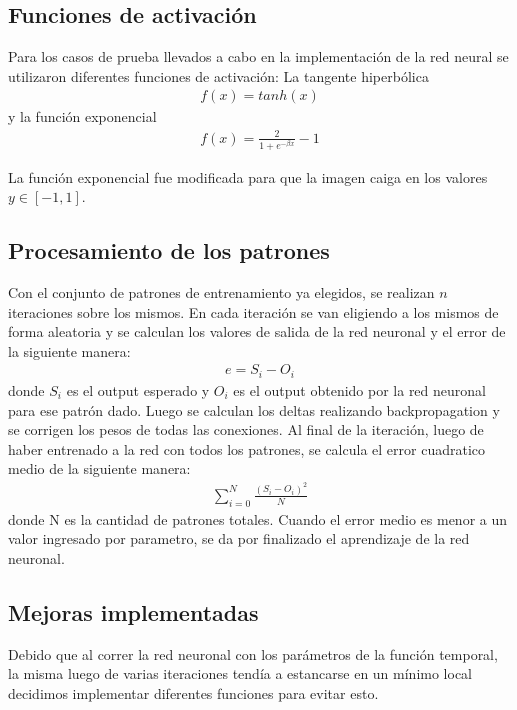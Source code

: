 \documentclass[11pt]{article}
\begin{document}
    \subsection{Funciones de activación}
    \par Para los casos de prueba llevados a cabo en la implementación de la red neural se utilizaron diferentes funciones de activación: La tangente hiperbólica \begin{eqnarray} \label{eq:solve} f(x) = tanh(x) \end{eqnarray} y la función exponencial \begin{eqnarray} \label{eq:solve} f(x) = \frac{2}{1+ e^{-\beta x}}-1 \end{eqnarray} 
    \par La función exponencial fue modificada para que la imagen caiga en los valores $y \in [-1 ,1]$.
    \subsection{Procesamiento de los patrones}
    \par Con el conjunto de patrones de entrenamiento ya elegidos, se realizan $n$ iteraciones sobre los mismos. En cada iteración se van eligiendo a los mismos de forma aleatoria y se calculan los valores de salida de la red neuronal y el error de la siguiente manera:
    \begin{eqnarray} \label{eq:solve} e = S_{i} - O_{i} \end{eqnarray} donde $S_{i}$ es el output esperado y $O_{i}$ es el output obtenido por la red neuronal para ese patrón dado. Luego se calculan los deltas realizando backpropagation y se corrigen los pesos de todas las conexiones. Al final de la iteración, luego de haber entrenado a la red con todos los patrones, se calcula el error cuadratico medio de la siguiente manera:
    \begin{eqnarray} \label{eq:solve} \sum\limits_{i=0}^N \frac{{(S_{i} - O_{i})}^2}{N} \end{eqnarray} donde N es la cantidad de patrones totales. Cuando el error medio es menor a un valor ingresado por parametro, se da por finalizado el aprendizaje de la red neuronal.
    
    \subsection{Mejoras implementadas}
    \par Debido que al correr la red neuronal con los parámetros de la función temporal, la misma luego de varias iteraciones tendía a estancarse en un mínimo local decidimos implementar diferentes funciones para evitar esto.
\end{document}
